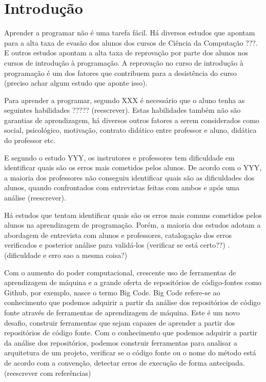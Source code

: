 \chapter{Introdução}
\label{cap:introducao}

Aprender a programar não é uma tarefa fácil. Há diversos estudos que apontam para a alta taxa de evasão dos alunos dos cursos de Ciência da Computação ???. E outros estudos apontam a alta taxa de reprovação por parte dos alunos nos cursos de introdução à programação. A reprovação no curso de introdução à programação é um dos fatores que contribuem para a desistência do curso (preciso achar algum estudo que aponte isso). 

Para aprender a programar, segundo XXX é necessário que o aluno tenha as seguintes habilidades ????? (reescrever). Estas habilidades também não são garantias de aprendizagem, há diversos outros fatores a serem considerados como social, psicológico, motivação, contrato didático entre professor e aluno, didática do professor etc. 

E segundo o estudo YYY, os instrutores e professores tem dificuldade em identificar quais são os erros mais cometidos pelos alunos. De acordo com o YYY, a maioria dos professores não conseguiu identificar quais são as dificuldades dos alunos, quando confrontados com entrevistas feitas com ambos e após uma análise (reescrever).

Há estudos que tentam identificar quais são os erros mais comuns cometidos pelos alunos na aprendizagem de programação. Porém, a maioria dos estudos adotam a abordagem de entrevista com alunos e professores, catalogação dos erros verificados e posterior análise para validá-los (verificar se está certo??) \cite{Hristova:2003:ICJ:792548.611956}.  (dificuldade e erro sao a mesma coisa?)

Com o aumento do poder computacional, crescente uso de ferramentas de aprendizagem de máquina e a grande oferta de repositórios de código-fontes como Github, por exemplo, nasce o termo Big Code. Big Code refere-se ao conhecimento que podemos adquirir a partir da análise dos repositórios de código fonte através de ferramentas de aprendizagem de máquina. Este é um novo desafio, construir ferramentas que sejam capazes de aprender a partir dos repositórios de código fonte. Com o conhecimento que podemos adquirir a partir da análise dos repositórios, podemos construir ferramentas para analisar a arquitetura de um projeto, verificar se o código fonte ou o nome do método está de acordo com a convenção, detectar erros de execução de forma antecipada. (reescrever com referências)

